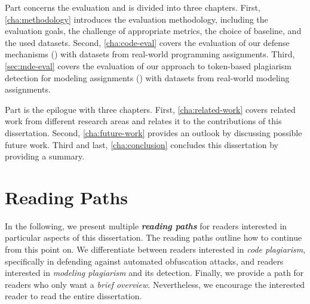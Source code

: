 Part  concerns the evaluation and is divided into three chapters.
First, \autoref{cha:methodology} introduces the evaluation methodology, including the evaluation goals, the challenge of appropriate metrics,  the choice of baseline, and the used datasets.
Second, \autoref{cha:code-eval} covers the evaluation of our defense mechanisms () with datasets from real-world programming assignments.
Third, \autoref{sec:mde-eval} covers the evaluation of our approach to token-based plagiarism detection for modeling assignments () with datasets from real-world modeling assignments.

Part  is the epilogue with three chapters.
First, \autoref{cha:related-work} covers related work from different research areas and relates it to the contributions of this dissertation.
Second, \autoref{cha:future-work} provides an outlook by discussing possible future work.
Third and last, \autoref{cha:conclusion} concludes this dissertation by providing a summary.
%

\section{Reading Paths}
In the following, we present multiple \textbf\textit{reading paths} for readers interested in particular aspects of this dissertation.
The reading paths outline how to continue from this point on.
We differentiate between readers interested in \textit{code plagiarism}, specifically in defending against automated obfuscation attacks, and readers interested in \textit{modeling plagiarism} and its detection. Finally, we provide a path for readers who only want a \textit{brief overview}. Nevertheless, we encourage the interested reader to read the entire dissertation.


